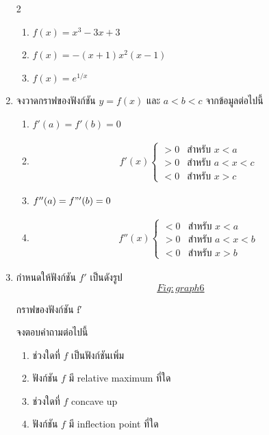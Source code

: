 \documentclass[
]{book}
\begin{document}
\begin{enumerate}
  2

  \begin{enumerate}
  \def\labelenumii{\arabic{enumii}.}
  \item
    \(f(x) = x^3-3x+3\)
  \item
    \(f(x) = -(x+1)x^2(x-1)\)
  \item
    \(f(x) = e^{1/x}\)
  \end{enumerate}
\item
  จงวาดกราฟของฟังก์ชัน \(y=f(x)\) และ \(a<b<c\) จากข้อมูลต่อไปนี้

  \begin{enumerate}
  \def\labelenumii{\arabic{enumii}.}
  \item
    \(f'(a) = f'(b) = 0\)
  \item
    \begin{equation}   \begin{aligned}
        f'(x)  \begin{cases}
        > 0 &\text{สำหรับ $x<a$} \\
        > 0 &\text{สำหรับ $a<x<c$} \\
        < 0 &\text{สำหรับ $x>c$}
        \end{cases}
      \end{aligned} \end{equation}
  \item
    \(f''(a) = f"'(b) = 0\)
  \item
    \begin{equation}   \begin{aligned}
        f''(x) \begin{cases}
        < 0 &\text{สำหรับ $x<a$} \\
        > 0 &\text{สำหรับ $a<x<b$} \\
        < 0 &\text{สำหรับ $x>b$}
        \end{cases}
      \end{aligned} \end{equation}
  \end{enumerate}
\item
  กำหนดให้ฟังก์ชัน \(f'\) เป็นดังรูป~\hyperref[Fig:graph6]{\[Fig:graph6\]}

  กราฟของฟังก์ชัน {f′}

  จงตอบคำถามต่อไปนี้

  \begin{enumerate}
  \def\labelenumii{\arabic{enumii}.}
  \item
    ช่วงใดที่ \(f\) เป็นฟังก์ชันเพิ่ม
  \item
    ฟังก์ชัน \(f\) มี relative maximum ที่ใด
  \item
    ช่วงใดที่ \(f\) concave up
  \item
    ฟังก์ชัน \(f\) มี inflection point ที่ใด
  \end{enumerate}
\end{enumerate}
\end{document}
